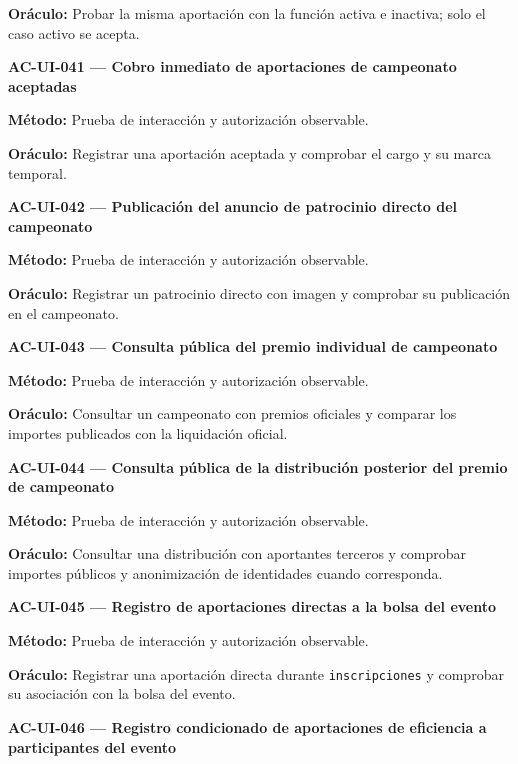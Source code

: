 \documentclass[10pt,letterpaper]{article}
\begin{document}
\textbf{Oráculo:} Probar la misma aportación con la función activa e inactiva; solo el caso activo se acepta.\par\vspace{0.45em}
\noindent\textbf{AC-UI-041 --- Cobro inmediato de aportaciones de campeonato aceptadas}\par
\textbf{Método:} Prueba de interacción y autorización observable.\par
\textbf{Oráculo:} Registrar una aportación aceptada y comprobar el cargo y su marca temporal.\par\vspace{0.45em}
\noindent\textbf{AC-UI-042 --- Publicación del anuncio de patrocinio directo del campeonato}\par
\textbf{Método:} Prueba de interacción y autorización observable.\par
\textbf{Oráculo:} Registrar un patrocinio directo con imagen y comprobar su publicación en el campeonato.\par\vspace{0.45em}
\noindent\textbf{AC-UI-043 --- Consulta pública del premio individual de campeonato}\par
\textbf{Método:} Prueba de interacción y autorización observable.\par
\textbf{Oráculo:} Consultar un campeonato con premios oficiales y comparar los importes publicados con la liquidación oficial.\par\vspace{0.45em}
\noindent\textbf{AC-UI-044 --- Consulta pública de la distribución posterior del premio de campeonato}\par
\textbf{Método:} Prueba de interacción y autorización observable.\par
\textbf{Oráculo:} Consultar una distribución con aportantes terceros y comprobar importes públicos y anonimización de identidades cuando corresponda.\par\vspace{0.45em}
\noindent\textbf{AC-UI-045 --- Registro de aportaciones directas a la bolsa del evento}\par
\textbf{Método:} Prueba de interacción y autorización observable.\par
\textbf{Oráculo:} Registrar una aportación directa durante \texttt{inscripciones} y comprobar su asociación con la bolsa del evento.\par\vspace{0.45em}
\noindent\textbf{AC-UI-046 --- Registro condicionado de aportaciones de eficiencia a participantes del evento}\par
\end{document}
